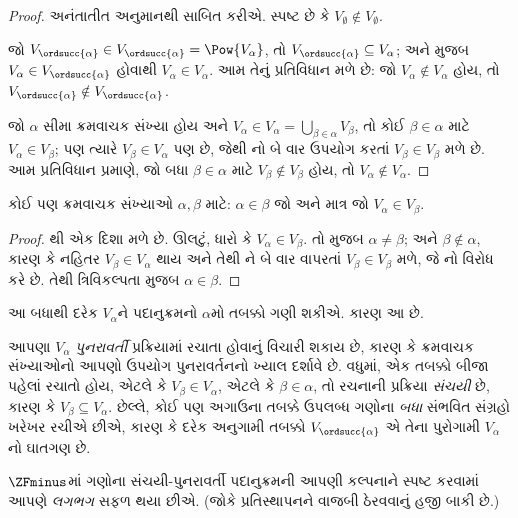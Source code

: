\begin{proof}
અનંતાતીત અનુમાનથી સાબિત કરીએ. સ્પષ્ટ છે કે
$V_\emptyset \notin V_\emptyset$.

જો $V_{\ordsucc{\alpha}} \in V_{\ordsucc{\alpha}} = \Pow{V_\alpha}$,
તો $V_{\ordsucc{\alpha}} \subseteq V_\alpha$; અને
 મુજબ $V_\alpha
\in V_{\ordsucc{\alpha}}$ હોવાથી
$V_\alpha \in V_\alpha$. આમ તેનું પ્રતિવિધાન મળે છે: જો
$V_\alpha \notin V_\alpha$ હોય, તો
$V_{\ordsucc{\alpha}} \notin V_{\ordsucc{\alpha}}$.

જો $\alpha$ સીમા ક્રમવાચક સંખ્યા હોય અને
$V_\alpha \in V_\alpha = \bigcup_{\beta \in
\alpha}V_\beta$, તો કોઈ $\beta \in
\alpha$ માટે $V_\alpha \in V_\beta$; પણ ત્યારે
$V_\beta \in V_\alpha$ પણ છે, જેથી
નો બે વાર ઉપયોગ કરતાં $V_\beta \in
V_\beta$ મળે છે. આમ પ્રતિવિધાન પ્રમાણે, જો બધા $\beta \in \alpha$
માટે $V_\beta
\notin V_\beta$ હોય, તો $V_\alpha \notin
V_\alpha$.
\end{proof}

\begin{cor}
કોઈ પણ ક્રમવાચક સંખ્યાઓ $\alpha, \beta$ માટે:
$\alpha \in \beta$ જો અને માત્ર જો $V_\alpha \in V_\beta$.
\end{cor}

\begin{proof}
થી એક દિશા મળે છે. ઊલટું, ધારો કે
$V_\alpha \in V_\beta$. તો  મુજબ
$\alpha \neq \beta$; અને $\beta \notin \alpha$, કારણ કે
નહિતર $V_\beta \in V_\alpha$ થાય અને તેથી
ને બે વાર વાપરતાં
$V_\beta \in V_\beta$ મળે, જે નો
વિરોધ કરે છે. તેથી ત્રિવિકલ્પતા મુજબ $\alpha \in \beta$.
\end{proof}
\noindent
આ બધાથી દરેક $V_\alpha$ને પદાનુક્રમનો $\alpha$મો તબક્કો
ગણી શકીએ. કારણ આ છે.

આપણા $V_\alpha$ \emph{પુનરાવર્તી} પ્રક્રિયામાં રચાતા હોવાનું
વિચારી શકાય છે, કારણ કે ક્રમવાચક સંખ્યાઓનો આપણો ઉપયોગ
પુનરાવર્તનનો ખ્યાલ દર્શાવે છે. વધુમાં, એક તબક્કો બીજા પહેલાં
રચાતો હોય, એટલે કે $V_\beta \in V_\alpha$, એટલે કે
$\beta \in \alpha$, તો રચનાની પ્રક્રિયા \emph{સંચયી} છે,
કારણ કે $V_\beta \subseteq V_\alpha$. છેલ્લે, કોઈ પણ અગાઉના
તબક્કે ઉપલબ્ધ ગણોના \emph{બધા} સંભવિત સંગ્રહો ખરેખર રચીએ
છીએ, કારણ કે દરેક અનુગામી તબક્કો $V_{\ordsucc{\alpha}}$
એ તેના પુરોગામી $V_\alpha$નો ઘાતગણ છે.

$\ZFminus$માં ગણોના સંચયી-પુનરાવર્તી પદાનુક્રમની આપણી
કલ્પનાને સ્પષ્ટ કરવામાં આપણે \emph{લગભગ} સફળ થયા છીએ.
(જોકે પ્રતિસ્થાપનને વાજબી ઠેરવવાનું હજી બાકી છે.)
\endgroup

